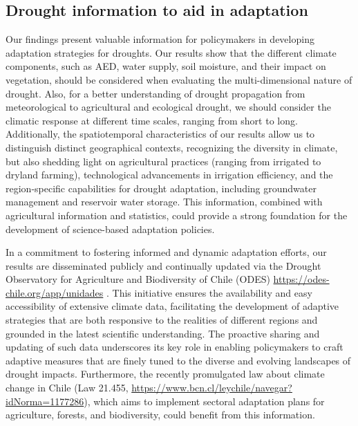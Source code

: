 \documentclass[
  authoryear,
  preprint,
  3p,
  onecolumn]{elsarticle}
\begin{document}
\hypertarget{drought-information-to-aid-in-adaptation}{%
\subsection{Drought information to aid in
adaptation}\label{drought-information-to-aid-in-adaptation}}

Our findings present valuable information for policymakers in developing
adaptation strategies for droughts. Our results show that the different
climate components, such as AED, water supply, soil moisture, and their
impact on vegetation, should be considered when evaluating the
multi-dimensional nature of drought. Also, for a better understanding of
drought propagation \citep{VanLoon2012} from meteorological to
agricultural and ecological drought, we should consider the climatic
response at different time scales, ranging from short to long.
Additionally, the spatiotemporal characteristics of our results allow us
to distinguish distinct geographical contexts, recognizing the diversity
in climate, but also shedding light on agricultural practices (ranging
from irrigated to dryland farming), technological advancements in
irrigation efficiency, and the region-specific capabilities for drought
adaptation, including groundwater management and reservoir water
storage. This information, combined with agricultural information and
statistics, could provide a strong foundation for the development of
science-based adaptation policies.

In a commitment to fostering informed and dynamic adaptation efforts,
our results are disseminated publicly and continually updated via the
Drought Observatory for Agriculture and Biodiversity of Chile (ODES)
\url{https://odes-chile.org/app/unidades}
\citep{Zambrano2023b, Kunst2023}. This initiative ensures the
availability and easy accessibility of extensive climate data,
facilitating the development of adaptive strategies that are both
responsive to the realities of different regions and grounded in the
latest scientific understanding. The proactive sharing and updating of
such data underscores its key role in enabling policymakers to craft
adaptive measures that are finely tuned to the diverse and evolving
landscapes of drought impacts. Furthermore, the recently promulgated law
about climate change in Chile (Law 21.455,
\url{https://www.bcn.cl/leychile/navegar?idNorma=1177286}), which aims
to implement sectoral adaptation plans for agriculture, forests, and
biodiversity, could benefit from this information.
\end{document}
